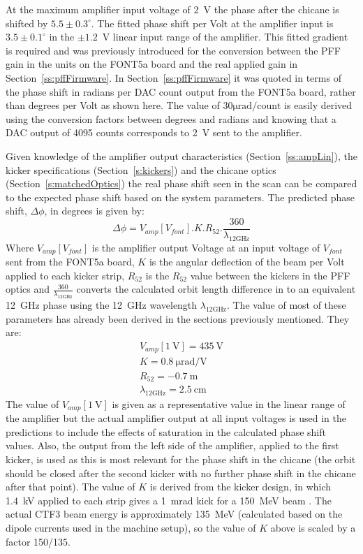 At the maximum amplifier input voltage of \(2\)~V the phase after the chicane is shifted by \(5.5\pm0.3^\circ\). The fitted phase shift per Volt at the amplifier input is \(3.5\pm0.1^\circ\) in the \(\pm1.2\)~V linear input range of the amplifier. This fitted gradient is required and was previously introduced for the conversion between the PFF gain in the units on the FONT5a board and the real applied gain in Section~\ref{ss:pffFirmware}. In Section~\ref{ss:pffFirmware} it was quoted in terms of the phase shift in radians per DAC count output from the FONT5a board, rather than degrees per Volt as shown here. The value of \(30\mathrm{\mu rad/count}\) is easily derived using the conversion factors between degrees and radians and knowing that a DAC output of 4095 counts corresponds to 2~V sent to the amplifier.

Given knowledge of the amplifier output characteristics (Section~\ref{ss:ampLin}), the kicker specifications (Section~\ref{s:kickers}) and the chicane optics (Section~\ref{s:matchedOptics}) the real phase shift seen in the scan can be compared to the expected phase shift based on the system parameters. The predicted phase shift, \(\Delta\phi\), in degrees is given by:
\begin{equation}
 	\Delta\phi = V_{amp}[V_{font}].K.R_{52}.\frac{360}{\lambda_{12\mathrm{GHz}}}
 	\label{e:ampVoltToPhase}
\end{equation} 
Where \(V_{amp}[V_{font}]\) is the amplifier output Voltage at an input voltage of \(V_{font}\) sent from the FONT5a board, \(K\) is the angular deflection of the beam per Volt applied to each kicker strip, \(R_{52}\) is the \(R_{52}\) value between the kickers in the PFF optics and \(\frac{360}{\lambda_{12\mathrm{GHz}}}\) converts the calculated orbit length difference in to an equivalent 12~GHz phase using the 12~GHz wavelength \(\lambda_{12\mathrm{GHz}}\). The value of most of these parameters has already been derived in the sections previously mentioned. They are:
\begin{eqnarray*}
V_{amp}[1~\mathrm{V}] = 435~\mathrm{V} \\
K = 0.8~\mathrm{\mu rad/V}\\
R_{52} = -0.7~\mathrm{m}\\
\lambda_{12\mathrm{GHz}} = 2.5~\mathrm{cm} 
\end{eqnarray*}
The value of \(V_{amp}[1~\mathrm{V}]\) is given as a representative value in the linear range of the amplifier but the actual amplifier output at all input voltages is used in the predictions to include the effects of saturation in the calculated phase shift values. Also, the output from the left side of the amplifier, applied to the first kicker, is used as this is most relevant for the phase shift in the chicane (the orbit should be closed after the second kicker with no further phase shift in the chicane after that point). The value of \(K\) is derived from the kicker design, in which 1.4~kV applied to each strip gives a 1~mrad kick for a 150~MeV beam \cite{kickerIPAC11}.  The actual CTF3 beam energy is approximately 135~MeV (calculated based on the dipole currents used in the machine setup), so the value of \(K\) above is scaled by a factor 150/135.

